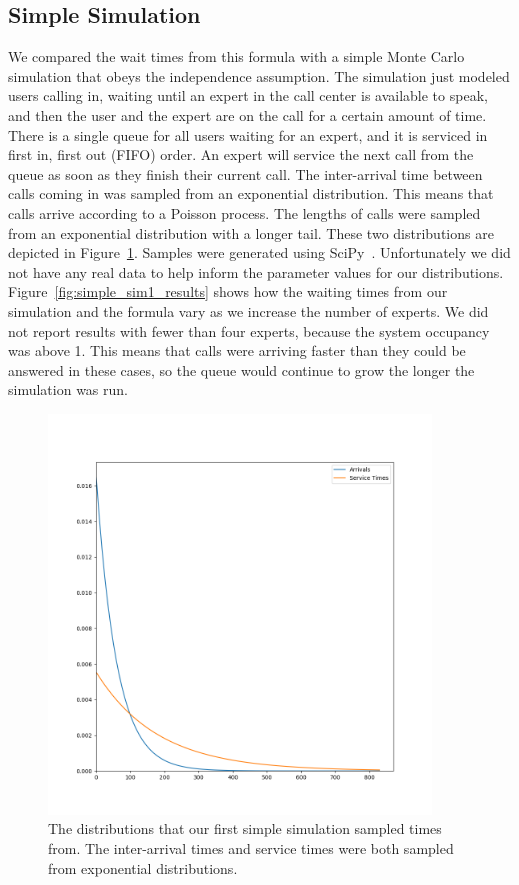 \subsection{Simple Simulation}

We compared the wait times from this formula with a simple Monte Carlo
simulation that obeys the independence assumption.
The simulation just modeled users calling in, waiting until an expert in the
call center is available to speak, and then the user and the expert are on the
call for a certain amount of time.
There is a single queue for all users waiting for an expert, and it is serviced
in first in, first out (FIFO) order.
An expert will service the next call from the queue as soon as they finish their
current call.
The inter-arrival time between calls coming in was sampled from an exponential
distribution.
This means that calls arrive according to a Poisson process.
The lengths of calls were sampled from an exponential distribution with a longer
tail.
These two distributions are depicted in Figure~\ref{fig:simple_sim1_dists}.
Samples were generated using SciPy~\cite{scipy}.
Unfortunately we did not have any real data to help inform the parameter values
for our distributions.
Figure~\ref{fig:simple_sim1_results} shows how the waiting times from our
simulation and the formula vary as we increase the number of experts.
We did not report results with fewer than four experts, because the system
occupancy was above 1.
This means that calls were arriving faster than they could be answered in these
cases, so the queue would continue to grow the longer the simulation was run.

\begin{figure}[h]
  \includegraphics[width=4in]{figures/montecarlo/expon_expon.png}
  \caption{
    The distributions that our first simple simulation sampled times from.
    The inter-arrival times and service times were both sampled from
    exponential distributions.
  }\label{fig:simple_sim1_dists}
\end{figure}

